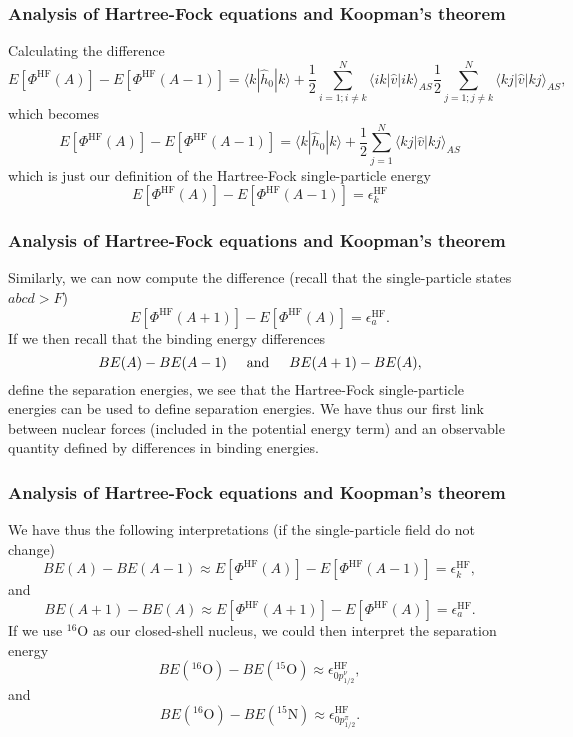 \documentclass{beamer}
\begin{document}
\begin{frame}
\frametitle{Analysis of Hartree-Fock equations and Koopman's theorem}

\begin{block}{}
Calculating the difference 
\[
  E[\Phi^{\mathrm{HF}}(A)]-   E[\Phi^{\mathrm{HF}}(A-1)] 
  = \langle k | \hat{h}_0 | k \rangle +
  \frac{1}{2}\sum_{i=1;i\ne k}^N\langle ik|\hat{v}|ik\rangle_{AS}  \frac{1}{2}\sum_{j=1;j\ne k}^N\langle kj|\hat{v}|kj\rangle_{AS},
\]
which becomes 
\[
  E[\Phi^{\mathrm{HF}}(A)]-   E[\Phi^{\mathrm{HF}}(A-1)] 
  = \langle k | \hat{h}_0 | k \rangle +
  \frac{1}{2}\sum_{j=1}^N\langle kj|\hat{v}|kj\rangle_{AS}
\]
which is just our definition of the Hartree-Fock single-particle energy
\[
  E[\Phi^{\mathrm{HF}}(A)]-   E[\Phi^{\mathrm{HF}}(A-1)] 
  = \epsilon_k^{\mathrm{HF}} 
\]
\end{block}
\end{frame}

\begin{frame}
\frametitle{Analysis of Hartree-Fock equations and Koopman's theorem}

\begin{block}{}
Similarly, we can now compute the difference (recall that the single-particle states $abcd > F$)
\[
  E[\Phi^{\mathrm{HF}}(A+1)]-   E[\Phi^{\mathrm{HF}}(A)]= \epsilon_a^{\mathrm{HF}}. 
\]
If we then recall that the binding energy differences 
\[
BE(A)-BE(A-1) \hspace{0.5cm} \mathrm{and} \hspace{0.5cm} BE(A+1)-BE(A), 
\]
define the separation energies, we see that the Hartree-Fock single-particle energies can be used to
define separation energies. We have thus our first link between nuclear forces (included in the potential energy term) and an observable quantity defined by differences in binding energies. 
\end{block}
\end{frame}

\begin{frame}
\frametitle{Analysis of Hartree-Fock equations and Koopman's theorem}

\begin{block}{}
We have thus the following interpretations (if the single-particle field do not change)
\[
BE(A)-BE(A-1)\approx  E[\Phi^{\mathrm{HF}}(A)]-   E[\Phi^{\mathrm{HF}}(A-1)] 
  = \epsilon_k^{\mathrm{HF}}, 
\]
and
\[
BE(A+1)-BE(A)\approx  E[\Phi^{\mathrm{HF}}(A+1)]-   E[\Phi^{\mathrm{HF}}(A)] =  \epsilon_a^{\mathrm{HF}}. 
\]
If  we use ${}^{16}\mbox{O}$ as our closed-shell nucleus, we could then interpret the separation energy
\[
BE(^{16}\mathrm{O})-BE(^{15}\mathrm{O})\approx \epsilon_{0p^{\nu}_{1/2}}^{\mathrm{HF}}, 
\]
and
\[
BE(^{16}\mathrm{O})-BE(^{15}\mathrm{N})\approx \epsilon_{0p^{\pi}_{1/2}}^{\mathrm{HF}}.
\]
\end{block}
\end{frame}
\end{document}
